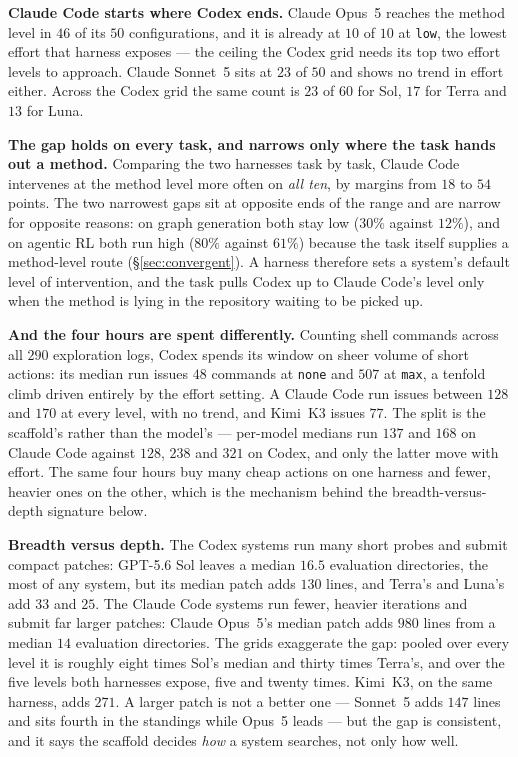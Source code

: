 \textbf{Claude Code starts where Codex ends.} Claude Opus~5 reaches the method level in $46$ of its
$50$ configurations, and it is already at $10$ of $10$ at \texttt{low}, the lowest effort that
harness exposes --- the ceiling the Codex grid needs its top two effort levels to approach. Claude
Sonnet~5 sits at $23$ of $50$ and shows no trend in effort either. Across the Codex grid the same
count is $23$ of $60$ for Sol, $17$ for Terra and $13$ for Luna.

\textbf{The gap holds on every task, and narrows only where the task hands out a method.} Comparing
the two harnesses task by task, Claude Code intervenes at the method level more often on \emph{all
ten}, by margins from $18$ to $54$ points. The two narrowest gaps sit at opposite ends of the range and are narrow for
opposite reasons: on graph generation both stay low ($30\%$ against $12\%$), and on agentic RL both run
high ($80\%$ against $61\%$) because the task itself supplies a method-level route
(\S\ref{sec:convergent}). A harness therefore sets a system's default level of intervention, and the
task pulls Codex up to Claude Code's level only when the method is lying in the repository waiting to
be picked up.

\textbf{And the four hours are spent differently.} Counting shell commands across all $290$
exploration logs, Codex spends its window on sheer volume of short actions: its median run issues $48$
commands at \texttt{none} and $507$ at \texttt{max}, a tenfold climb driven entirely by the effort
setting. A Claude Code run issues between $128$ and $170$ at every level, with no
trend, and Kimi~K3 issues $77$. The split is the scaffold's rather than the model's --- per-model
medians run $137$ and $168$ on Claude Code against $128$, $238$ and $321$ on Codex, and only the latter
move with effort. The same four hours buy many cheap actions on one harness and fewer, heavier ones on
the other, which is the mechanism behind the breadth-versus-depth signature below.

\textbf{Breadth versus depth.} The Codex systems run many short probes and submit compact patches:
GPT-5.6 Sol leaves a median $16.5$ evaluation directories, the most of any system, but its median
patch adds $130$ lines, and Terra's and Luna's add $33$ and $25$. The Claude Code systems run fewer,
heavier iterations and submit far larger patches: Claude Opus~5's median patch adds $980$ lines from
a median $14$ evaluation directories. The grids exaggerate the gap: pooled over every level it is roughly eight
times Sol's median and thirty times Terra's, and over the five levels both harnesses expose, five and
twenty times. Kimi~K3, on the
same harness, adds $271$. A larger patch is not a better one --- Sonnet~5 adds $147$ lines and sits fourth
in the standings while Opus~5 leads --- but the gap is consistent, and it says the scaffold decides
\emph{how} a system searches, not only how well.

